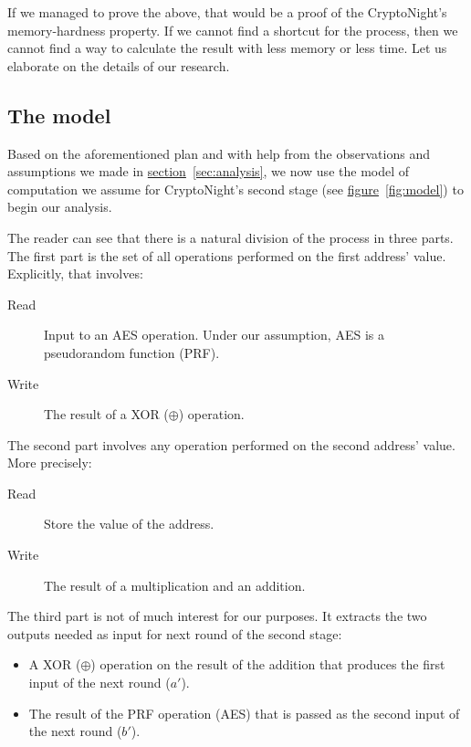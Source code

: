 If we managed to prove the above, that would be a proof of the CryptoNight's memory-hardness property. If we cannot find a shortcut for the process, then we cannot find a way to calculate the result with less memory or less time. Let us elaborate on the details of our research.

\subsection{The model}
Based on the aforementioned plan and with help from the observations and assumptions we made in \hyperref[sec:analysis]{section}~\ref{sec:analysis}, we now use the model of computation we assume for CryptoNight's second stage (see \hyperref[fig:model]{figure}~\ref{fig:model}) to begin our analysis.

The reader can see that there is a natural division of the process in three parts. The first part is the set of all operations performed on the first address' value. Explicitly, that involves:
\begin{description}
  \item [Read] Input to an AES operation. Under our assumption, AES is a pseudorandom function (PRF).
  \item [Write] The result of a XOR ($\oplus$) operation.
\end{description}

The second part involves any operation performed on the second address' value. More precisely:
\begin{description}
  \item [Read] Store the value of the address.
  \item [Write] The result of a multiplication and an addition.
\end{description}

The third part is not of much interest for our purposes. It extracts the two outputs needed as input for next round of the second stage:
\begin{itemize}
  \item A XOR ($\oplus$) operation on the result of the addition that produces the first input of the next round ($a'$).
  \item The result of the PRF operation (AES) that is passed as the second input of the next round ($b'$).
\end{itemize}
\clearpage

